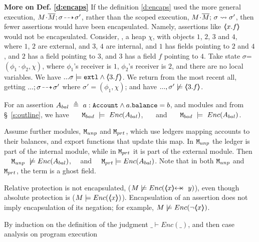 \noindent
\textbf{More on Def. \ref{d:encaps}} {If the definition \ref{d:encaps} used the more general execution, $M\!\cdot\!\overline{M};\sigma\! \dashrightarrow\! {\sigma'}$, rather than the scoped execution,  $M\!\cdot\!\overline{M};\, {\sigma} \rightsquigarrow \sigma'$, then fewer assertions would have been encapsulated.}
Namely, assertions like    $\langle\!\!\langle x.f \rangle\!\!\rangle$ would not be encapsulated.
Consider, \eg, a heap $\chi$, with objects $1$, $2$, $3$ and $4$, where  $1$, $2$ are external, and $3$, $4$ are internal, and  $1$ has fields pointing to $2$ and $4$, and $2$ has a field pointing to $3$, and $3$ has a field $f$ pointing to $4$. Take  state $\sigma$=$(\phi_1\!\cdot\!\phi_2,\chi)$, where $\phi_1$'s receiver is $1$,  $\phi_2$'s receiver is $2$,   and there are no local variables. 
We have  $...\sigma\models \mbox{\normalfont{\texttt{extl}}} \wedge \langle\!\!\langle 3.f \rangle\!\!\rangle$. 
We  return from the most recent all, 
getting  $...;\sigma\! \dashrightarrow\! {\sigma'}$ where $\sigma'=(\phi_1,\chi)$; and have   $...,\sigma'\not\models  \langle\!\!\langle 3.f \rangle\!\!\rangle$.

\begin{example}
\label{ex:not:encaps}
For an assertion $A_{bal}\  \triangleq\ a:\prg{Account}\wedge a.\prg{balance}=b$, %
and modules \ModB and  \ModC  from \S~\ref{s:outline}, we have  \ \ \ $\mbox{\normalfont{\texttt{M}}}_{{bad}}\ \models\ {Enc(  A_{bal}  )}$, \ \ \ and \ \ \ $\mbox{\normalfont{\texttt{M}}}_{{bad}}\ \models\ {Enc(  A_{bal}  )}$.
\end{example}


\begin{example} Assume   further modules, $\mbox{\normalfont{\texttt{M}}}_{{unp}}$ and $\mbox{\normalfont{\texttt{M}}}_{{prt}}$,  which  use ledgers mapping  accounts to their balances, and export functions that update this map. In  $\mbox{\normalfont{\texttt{M}}}_{{unp}}$ the ledger is  part of the {internal} module, %
while in $\mbox{\normalfont{\texttt{M}}}_{{prt}}$ it is part of the  {external} module.
Then  \ \ $\ModD \ \not\models\encaps{ A_{bal}} $, \ \  and \ \ $\mbox{\normalfont{\texttt{M}}}_{{prt}}  \models {\ensuremath Enc(  A_{bal} )} $.
Note that in both $\mbox{\normalfont{\texttt{M}}}_{{unp}}$ and $\mbox{\normalfont{\texttt{M}}}_{{prt}}$, the term  is a ghost field. 
\end{example}

\begin{note} Relative protection %
is not encapsulated, (\eg $M \not\models {\encaps{\protectedFrom{x}{y}}}$), even though    absolute protection is
(\eg $M \models {\ensuremath Enc( \ensuremath{\langle\!\!\langle x \rangle\!\!\rangle} )}$).
Encapsulation of an assertion does not imply encapsulation of its negation; 
 for example,  $M \not\models {{\ensuremath Enc( \neg\ensuremath{\langle\!\!\langle x \rangle\!\!\rangle} )}}$.
\end{note}

By induction on the definition of the judgment $\_ \vdash Enc(\_)$, and then case analysis on program execution
\completeProof

 


